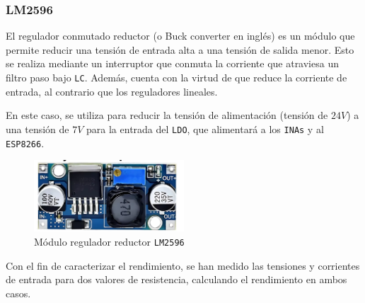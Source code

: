 \subsubsection{LM2596}

El regulador conmutado reductor (o Buck converter en inglés) es un módulo que permite reducir una tensión de entrada alta a una tensión de salida menor. Esto se realiza mediante un interruptor que conmuta la corriente que atraviesa un filtro paso bajo \texttt{LC}. Además, cuenta con la virtud de que reduce la corriente de entrada, al contrario que los reguladores lineales. \cite{texasinstrumentsLM2596SIMPLESWITCHER}

En este caso, se utiliza para reducir la tensión de alimentación (tensión de $24 V$) a una tensión de $7 V$ para la entrada del \texttt{LDO}, que alimentará a los \texttt{INAs} y al \texttt{ESP8266}.

\begin{figure}[H]
    \centering
    \includegraphics[width=0.5\textwidth]{images/2-hardware/componentes/LM2596.png}
    \caption{Módulo regulador reductor \texttt{LM2596}}
    \label{fig:hardware/modulos/lm2596}
\end{figure}

Con el fin de caracterizar el rendimiento, se han medido las tensiones y corrientes de entrada para dos valores de resistencia, calculando el rendimiento en ambos casos.

